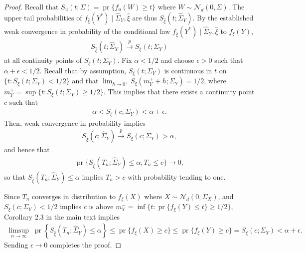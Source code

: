\documentclass[11pt]{article}
\newcommand{\1}{\mathbbm{1}}
\def\pr{{\operatorname{pr}}}
\theoremstyle{plain}
\theoremstyle{definition}
\begin{document}
\begin{proof}
Recall that $S_u(t;\Sigma) = \pr\{f_u(W)\geq t\}$ where $W\sim\mathcal{N}_d(0, \Sigma)$. The upper tail probabilities of $f_{\hat{\xi}}(Y^*)\mid \hat{\Sigma}_Y, \hat{\xi}$ are thus $S_{\hat{\xi}}(t;\hat{\Sigma}_Y)$. By the established weak convergence in probability of the conditional law $f_{\hat{\xi}}(Y^*)\mid \hat{\Sigma}_Y, \hat{\xi}$ to $f_{\xi}(Y)$, 
\begin{align*} S_{\hat{\xi}}(t;\hat{\Sigma}_Y)\overset{p}{\rightarrow} S_{\xi}(t;\Sigma_Y)\end{align*} at all continuity points of $S_{\xi}(t;\Sigma_Y)$. Fix $\alpha < 1/2$ and choose $\epsilon > 0$ such that $\alpha+\epsilon < 1/2$. Recall that by assumption, $S_{\xi}(t; \Sigma_Y)$ is continuous in $t$ on $\{t: S_{\xi}(t;\Sigma_Y) < 1/2\}$ and that $\lim_{h\rightarrow 0^+}S_{\xi}(m_Y^+ +h;\Sigma_Y) = 1/2$, where $m_Y^+ =  \sup\{t:S_\xi(t;\Sigma_Y) \geq 1/2\}$. This implies that there exists a continuity point $c$ such that 
\begin{align*}\alpha < S_{\xi}(c;\Sigma_Y) < \alpha+\epsilon.\end{align*} Then, weak convergence in probability implies 
\begin{align*}S_{\hat{\xi}}(c;\hat{\Sigma}_Y) \overset{p}{\rightarrow} S_{\xi}(c;\Sigma_Y) > \alpha,\end{align*} and hence that 
\begin{align*}
\operatorname{pr}\{S_{\hat{\xi}}(T_n;\hat{\Sigma}_Y) \leq \alpha, T_n \leq c\} \rightarrow 0,
\end{align*}
so that $S_{\hat{\xi}}(T_n;\hat{\Sigma}_Y) \leq \alpha$ implies $T_n > c$ with probability tending to one. 

Since $T_n$ converges in distribution to $f_\xi(X)$ where $X\sim \mathcal{N}_d(0, \Sigma_X)$, and $S_{\xi}(c;\Sigma_Y) < 1/2$ implies $c$ is above $m^-_Y = \inf\{t: \operatorname{pr}\{f_\xi(Y)\leq t\} \geq 1/2\}$, Corollary 2.3 in the main text implies
\begin{align*}
    \limsup_{n\rightarrow\infty} \;\operatorname{pr}\left\{S_{\hat{\xi}}(T_n;\hat{\Sigma}_Y) \leq \alpha\right\} \leq \operatorname{pr}\{f_\xi(X) \geq c\} \leq \operatorname{pr}\{f_\xi(Y) \geq c\} = S_{\xi}(c;\Sigma_Y) < \alpha+\epsilon.
\end{align*}
Sending $\epsilon\rightarrow 0$ completes the proof.
\end{proof}



\end{document}

